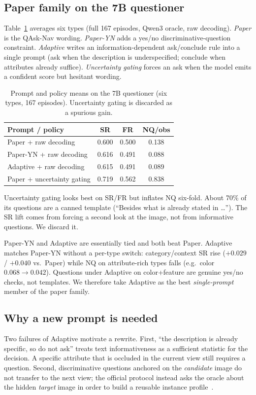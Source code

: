 \documentclass[10pt,a4paper]{article}
\begin{document}
\subsection{Paper family on the 7B questioner}
Table~\ref{tab:prompt7b} averages six types (full 167 episodes, Qwen3
oracle, raw decoding). \emph{Paper} is the QAsk-Nav wording.
\emph{Paper-YN} adds a yes/no discriminative-question constraint.
\emph{Adaptive} writes an information-dependent ask/conclude rule into
a single prompt (ask when the description is underspecified; conclude
when attributes already suffice). \emph{Uncertainty gating} forces an
ask when the model emits a confident score but hesitant wording.

\begin{table}[h]
\centering
\small
\begin{tabular}{lccc}
\toprule
Prompt / policy & SR & FR & NQ/obs \\
\midrule
Paper + raw decoding & 0.600 & 0.500 & 0.138 \\
Paper-YN + raw decoding & 0.616 & 0.491 & 0.088 \\
Adaptive + raw decoding & 0.615 & 0.491 & 0.089 \\
Paper + uncertainty gating & 0.719 & 0.562 & 0.838 \\
\bottomrule
\end{tabular}
\caption{Prompt and policy means on the 7B questioner (six types,
167 episodes). Uncertainty gating is discarded as a spurious gain.}
\label{tab:prompt7b}
\end{table}

Uncertainty gating looks best on SR/FR but inflates NQ six-fold.
About 70\% of its questions are a canned template (``Besides what is
already stated in \ldots''). The SR lift comes from forcing a second
look at the image, not from informative questions. We discard it.

Paper-YN and Adaptive are essentially tied and both beat Paper.
Adaptive matches Paper-YN without a per-type switch: category/context
SR rise ($+0.029$ / $+0.040$ vs.\ Paper) while NQ on
attribute-rich types falls (e.g.\ color $0.068\rightarrow 0.042$).
Questions under Adaptive on color+feature are genuine yes/no checks,
not templates. We therefore take Adaptive as the best
\emph{single-prompt} member of the paper family.

\subsection{Why a new prompt is needed}
Two failures of Adaptive motivate a rewrite. First, ``the description
is already specific, so do not ask'' treats text informativeness as a
sufficient statistic for the decision. A specific attribute that is
occluded in the current view still requires a question. Second,
discriminative questions anchored on the \emph{candidate} image do not
transfer to the next view; the official protocol instead asks the
oracle about the hidden \emph{target} image in order to build a
reusable instance profile~\cite{zorzi2026coinqa}.
\end{document}
